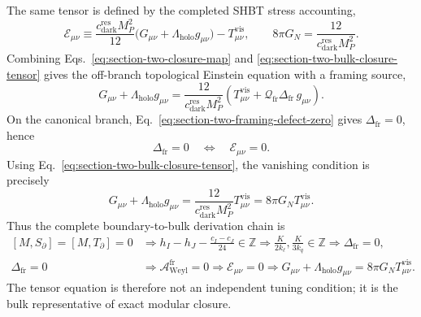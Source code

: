 \documentclass[11pt,letterpaper]{article}
\theoremstyle{plain}
\newcommand{\kell}{k_{\ell}}
\newcommand{\kq}{k_q}
\newcommand{\Kpar}{K}
\newcommand{\Deltafr}{\Delta_{\text{fr}}}
\newcommand{\cdarkres}{c_{\text{dark}}^{\text{res}}}
\newcommand{\Lholo}{\Lambda_{\text{holo}}}
\newcommand{\MP}{M_P}
\newcommand{\GN}{G_N}
\newcommand{\Ebulk}{\mathcal E_{\mu\nu}}
\begin{document}
The same tensor is defined by the completed SHBT stress accounting,
\begin{equation}
\label{eq:section-two-bulk-closure-tensor}
 \mathcal{E}_{\mu\nu}
 \equiv
 \frac{\cdarkres\MP^2}{12}
 \bigl(G_{\mu\nu}+\Lholo g_{\mu\nu}\bigr)
 -T^{\text{vis}}_{\mu\nu},
 \qquad
 8\pi\GN=\frac{12}{\cdarkres\MP^2}.
\end{equation}
Combining Eqs.~\eqref{eq:section-two-closure-map} and
\eqref{eq:section-two-bulk-closure-tensor} gives the off-branch
topological Einstein equation with a framing source,
\begin{equation}
\label{eq:section-two-off-branch-einstein}
 G_{\mu\nu}+\Lholo g_{\mu\nu}
 =
 \frac{12}{\cdarkres\MP^2}
 \left(T^{\text{vis}}_{\mu\nu}
 +\mathcal Q_{\text{fr}}\Deltafr\,g_{\mu\nu}\right).
\end{equation}
On the canonical branch, Eq.~\eqref{eq:section-two-framing-defect-zero} gives
$\Deltafr=0$, hence
\begin{equation}
\label{eq:section-two-defect-bulk-equivalence}
 \Deltafr=0
 \quad\Longleftrightarrow\quad
 \Ebulk=0.
\end{equation}
Using Eq.~\eqref{eq:section-two-bulk-closure-tensor}, the vanishing condition is
precisely
\begin{equation}
\label{eq:section-two-einstein-equivalence}
 G_{\mu\nu}+\Lholo g_{\mu\nu}
 =
 \frac{12}{\cdarkres\MP^2}T^{\text{vis}}_{\mu\nu}
 =
 8\pi\GN T^{\text{vis}}_{\mu\nu}.
\end{equation}
Thus the complete boundary-to-bulk derivation chain is
\begin{equation}
\label{eq:section-two-full-closure-chain}
\begin{aligned}
 [M,S_{\partial}]=[M,T_{\partial}]=0
 &\Longrightarrow
 h_I-h_J-\frac{c_I-c_J}{24}\in\mathbb Z
 \Longrightarrow
 \frac{\Kpar}{2\kell},\frac{\Kpar}{3\kq}\in\mathbb Z
 \Longrightarrow
 \Deltafr=0,
 \\
 \Deltafr=0
 &\Longrightarrow
 \mathcal A_{\text{Weyl}}^{\text{fr}}=0
 \Longrightarrow
 \Ebulk=0
 \Longrightarrow
 G_{\mu\nu}+\Lholo g_{\mu\nu}
 =8\pi\GN T^{\text{vis}}_{\mu\nu}.
\end{aligned}
\end{equation}
The tensor equation is therefore not an independent tuning condition; it is the
bulk representative of exact modular closure.
\end{document}
